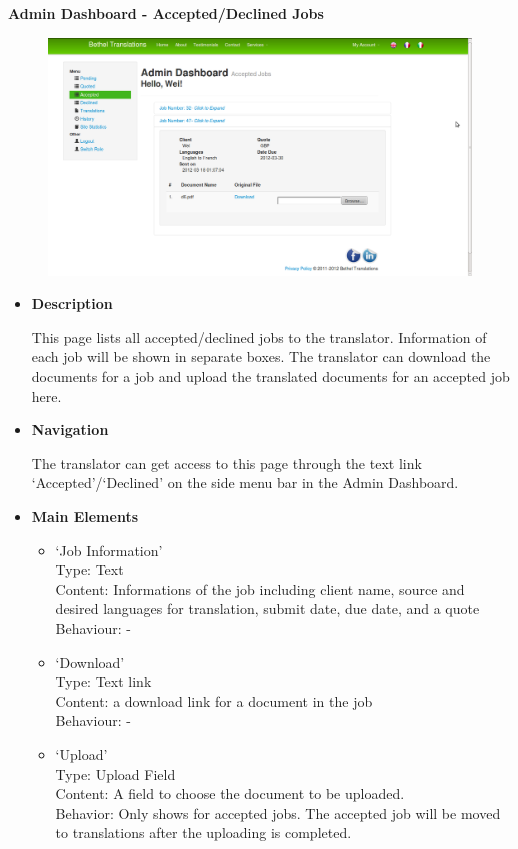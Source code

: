 \documentclass{l3proj}
\begin{document}
\textbf{Admin Dashboard - Accepted/Declined Jobs}
\begin{figure}[H]
\centering
\includegraphics[width=0.8\linewidth]{images/adminDashAccepted}
\vspace{-30pt}
\end{figure}

\begin{itemize}
\item \textbf{Description}

This page lists all accepted/declined jobs to the translator. Information of each job will be shown in separate boxes. 
The translator can download the documents for a job and upload the translated documents for an accepted job here.

\item \textbf{Navigation}

The translator can get access to this page through the text link `Accepted'/`Declined' on the side menu bar in the Admin Dashboard.

\item \textbf{Main Elements}
\begin{itemize}

\item `Job Information'\\
Type: Text\\
Content: Informations of the job including client name, source and desired languages for translation, submit date, due date, and a quote \\
Behaviour: -\\

\item `Download'\\
Type: Text link\\
Content: a download link for a document in the job\\
Behaviour: -\\

\item `Upload'\\
Type: Upload Field\\
Content: A field to choose the document to be uploaded.\\
Behavior: Only shows for accepted jobs. The accepted job will be moved to translations after the uploading is completed.\\

\end{itemize}
\end{itemize}
\end{document}
